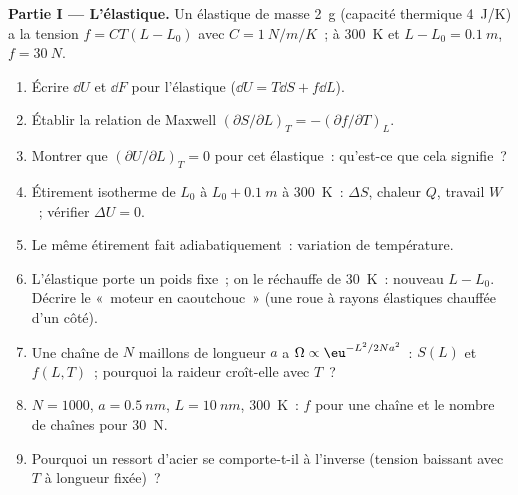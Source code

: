 \begin{problem}\label{pb:b2:thermodynamic-potentials:1}
\textbf{Partie I --- L'élastique.}
Un élastique de masse \qty{2}{g} (capacité thermique \qty{4}{J/K}) a la tension
$f = CT(L - L_0)$ avec $C = \qty{1}{N/m/K}$~; à \qty{300}{K} et $L - L_0 =
\qty{0.1}{m}$, $f = \qty{30}{N}$.
\begin{enumerate}
  \item Écrire $\dd U$ et $\dd F$ pour l'élastique ($\dd U = T\dd S + f\dd L$).
  \item Établir la relation de Maxwell $(\partial S/\partial L)_T = -(\partial
        f/\partial T)_L$.
  \item Montrer que $(\partial U/\partial L)_T = 0$ pour cet élastique~: qu'est-ce que
        cela signifie~?
  \item Étirement isotherme de $L_0$ à $L_0 + \qty{0.1}{m}$ à
        \qty{300}{K}~: $\Delta S$, chaleur $Q$, travail $W$~; vérifier $\Delta U = 0$.
  \item Le même étirement fait adiabatiquement~: variation de température.
  \item L'élastique porte un poids fixe~; on le réchauffe de \qty{30}{K}~: nouveau
        $L - L_0$. Décrire le «~moteur en caoutchouc~» (une roue à
        rayons élastiques chauffée d'un côté).
  \item Une chaîne de $N$ maillons de longueur $a$ a $\Omega \propto \eu^{-L^2/2Na^2}$~:
        $S(L)$ et $f(L,T)$~; pourquoi la raideur croît-elle avec $T$~?
  \item $N = 1000$, $a = \qty{0.5}{nm}$, $L = \qty{10}{nm}$, \qty{300}{K}~: $f$
        pour une chaîne et le nombre de chaînes pour \qty{30}{N}.
  \item Pourquoi un ressort d'acier se comporte-t-il à l'inverse (tension baissant
        avec $T$ à longueur fixée)~?
\end{enumerate}


\end{problem}
